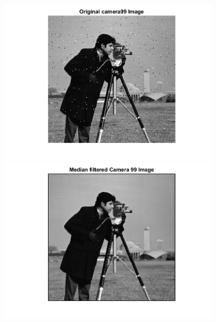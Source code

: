 \documentclass[11pt]{article} %
\begin{document}
\begin{figure}
 \centering
	\includegraphics{1aa.png}
	\includegraphics{1ab.png}
\end{figure}
\end{document}
